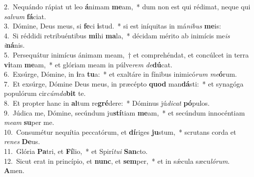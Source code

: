 {2.~}Nequándo rápiat ut leo \textbf{á}nimam \textbf{me}am,~* dum non est qui rédimat, neque qui \textit{sal}\textit{vum} \textbf{fá}ciat.\\
{3.~}Dómine, Deus meus, si \textbf{fe}ci \textbf{i}stud.~* si est iníquitas in má\textit{ni}\textit{bus} \textbf{me}is:\\
{4.~}Si réddidi retribuéntibus \textbf{mi}hi \textbf{ma}la,~* décidam mérito ab inimícis me\textit{is} \textit{i}\textbf{ná}nis.\\
{5.~}Persequátur inimícus ánimam meam,~† et comprehéndat, et concúlcet in terra \textbf{vi}tam \textbf{me}am,~* et glóriam meam in púlve\textit{rem} \textit{de}\textbf{dú}cat.\\
{6.~}Exsúrge, Dómine, in \textbf{i}ra \textbf{tu}a:~* et exaltáre in fínibus inimicó\textit{rum} \textit{me}\textbf{ó}rum.\\
{7.~}Et exsúrge, Dómine Deus meus, in præcépto \textbf{quod} man\textbf{dá}sti:~* et synagóga populórum cir\textit{cúm}\textit{da}\textbf{bit} te.\\
{8.~}Et propter hanc in \textbf{al}tum re\textbf{gré}dere:~* Dóminus jú\textit{di}\textit{cat} \textbf{pó}pulos.\\
{9.~}Júdica me, Dómine, secúndum ju\textbf{stí}tiam \textbf{me}am,~* et secúndum innocéntiam \textit{me}\textit{am} \textbf{su}per me.\\
{10.~}Consumétur nequítia peccatórum, et \textbf{dí}riges \textbf{ju}stum,~* scrutans corda et \textit{re}\textit{nes} \textbf{De}us.\\
{11.~}Glória \textbf{Pa}tri, et \textbf{Fí}lio,~* et Spirí\textit{tu}\textit{i} \textbf{San}cto.\\
{12.~}Sicut erat in princípio, et \textbf{nunc}, et \textbf{sem}per,~* et in sǽcula sæcu\textit{ló}\textit{rum}. \textbf{A}men.\\
